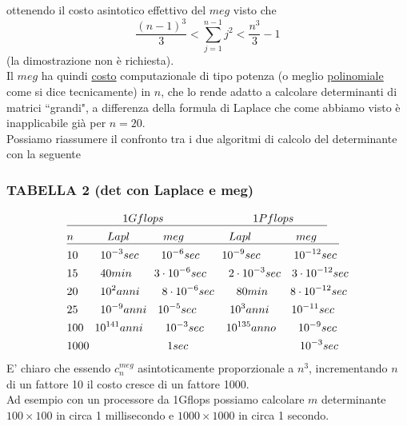\documentclass[12pt,a4paper]{article}
\begin{document}
ottenendo il costo asintotico effettivo del $meg$ visto che
\begin{equation*}
    \frac{(n-1)^3}{3}<\sum_{j=1}^{n-1}j^2<\frac{n^3}{3}-1
\end{equation*}
(la dimostrazione non è richiesta).\\Il $meg$ ha quindi \uline{costo} computazionale di tipo potenza (o meglio \uline{polinomiale} come si dice tecnicamente) in $n$, che lo rende adatto a calcolare determinanti di matrici ``grandi", a differenza della formula di Laplace che come abbiamo visto è inapplicabile già per $n=20$.\\Possiamo riassumere il confronto tra i due algoritmi di calcolo del determinante con la seguente

\subsubsection{TABELLA 2 (det con Laplace e meg)}
\[ \begin{split}
	& \uline{\quad\quad\quad\quad \quad1Gflops\quad\quad \quad\quad\quad\quad\quad\quad1Pflops \quad\quad\quad }\\
	& \uline{n\quad\quad\quad Lapl\quad\quad\quad meg\quad\quad\quad\quad Lapl\quad\quad\quad\quad meg\quad\quad}\\
	&  10\quad\quad 10^{-3}sec\quad\quad 10^{-6}sec\quad\quad 10^{-9}sec\quad\quad\quad 10^{-12}sec\\
	&  15\quad\quad 40min\quad\quad 3\cdot10^{-6}sec\quad\quad 2\cdot10^{-3}sec\quad 3\cdot10^{-12}sec\\
	& 20\quad\quad 10^{2}anni\quad\quad 8\cdot10^{-6}sec\quad\quad 80min\quad\quad 8\cdot10^{-12}sec\\
	& 25\quad\quad 10^{-9}anni\quad 10^{-5}sec\quad\quad\quad 10^3anni\quad\quad 10^{-11}sec\\
	& 100\quad 10^{141}anni\quad\quad 10^{-3}sec\quad\quad 10^{135}anno\quad\quad 10^{-9}sec\\ 
	& 1000\quad\quad \quad\quad\quad\quad\quad 1sec\quad\quad\quad \quad\quad\quad\quad\quad\quad\quad10^{-3}sec\\ 
\end{split} \]
E' chiaro che essendo $c_n^{meg}$ asintoticamente proporzionale a $n^3$, incrementando $n$ di un fattore 10 il costo cresce di un fattore 1000.\\Ad esempio con un processore da 1Gflops possiamo calcolare $m$ determinante $100\times 100$ in circa 1 millisecondo e $1000\times 1000$ in circa 1 secondo.
\end{document}
